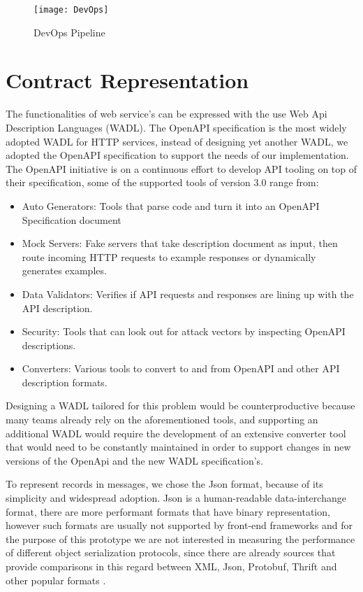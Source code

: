 \begin{figure}[htbp]
    \centering
    \texttt{[image: DevOps]}
    \caption{DevOps Pipeline}
    \label{fig:pipeline}
\end{figure}

\newpage

\section{Contract Representation} %
\label{sec:contract_representation}

The functionalities of web service's can be expressed with the
use Web Api Description Languages (WADL).
The OpenAPI specification is the most
widely adopted WADL for HTTP services, instead of designing yet another WADL, we
adopted the OpenAPI specification to support the needs of our implementation.
The OpenAPI initiative is on a continuous effort to develop API tooling on top of their specification, some of the supported tools of version 3.0 range from:

\begin{itemize}
    \item Auto Generators: Tools that parse code and turn it into an OpenAPI Specification document
    \item Mock Servers: Fake servers that take description document as input, then route incoming HTTP requests to example responses or dynamically generates examples.
    \item Data Validators: Verifies if API requests and responses are lining up with the API description.
    \item Security: Tools that can look out for attack vectors by inspecting OpenAPI descriptions.
    \item Converters: Various tools to convert to and from OpenAPI and other API description formats.
\end{itemize}

Designing a WADL tailored for this problem would be counterproductive because many teams already rely on the aforementioned tools,
and supporting an additional WADL would require the development of an extensive converter tool
that would need to be constantly maintained in order to support changes in new versions of the OpenApi and the new WADL specification's.

To represent records in messages, we chose the Json format, because of its simplicity and widespread adoption.
Json is a human-readable data-interchange format,
there are more performant formats that have binary representation,
however such formats are usually not supported by front-end frameworks and for the purpose of this prototype
we are not interested in measuring the performance of different object serialization protocols, since
there are already sources that provide comparisons in this regard between XML, Json, Protobuf, Thrift and other popular formats \cite{serializationBenchmark}.

